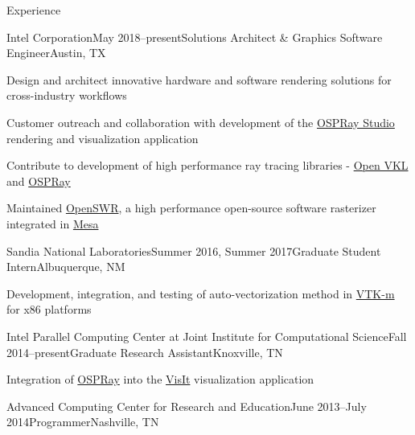 \documentclass{resume} %
\begin{document}
\begin{rSection}{Experience}

\begin{rSubsection}{Intel Corporation}{May 2018--present}{Solutions Architect \& Graphics Software Engineer}{Austin, TX}
    \item Design and architect innovative hardware and software rendering solutions for cross-industry workflows
    \item Customer outreach and collaboration with development of the \href{https://github.com/ospray/ospray\_studio}{OSPRay Studio} rendering and visualization application
    \item Contribute to development of high performance ray tracing libraries - \href{https://www.openvkl.org/}{Open VKL} and \href{https://www.ospray.org/}{OSPRay}
    \item Maintained \href{http://openswr.org/}{OpenSWR}, a high performance open-source software rasterizer integrated in \href{https://www.mesa3d.org/}{Mesa}
\end{rSubsection}


\begin{rSubsection}{Sandia National Laboratories}{Summer 2016, Summer 2017}{Graduate Student Intern}{Albuquerque, NM}
    \item Development, integration, and testing of auto-vectorization method in \href{http://m.vtk.org}{VTK-m} for x86 platforms
\end{rSubsection}


\begin{rSubsection}{Intel Parallel Computing Center at Joint Institute for Computational Science}{Fall 2014--present}{Graduate Research Assistant}{Knoxville, TN}
    \item Integration of \href{http://www.ospray.org/}{OSPRay} into the \href{https://visit.llnl.gov/}{VisIt} visualization application
\end{rSubsection}


\begin{rSubsectionNoList}{Advanced Computing Center for Research and Education}{June 2013--July 2014}{Programmer}{Nashville, TN}
\end{rSubsectionNoList}



\end{rSection}
\end{document}
